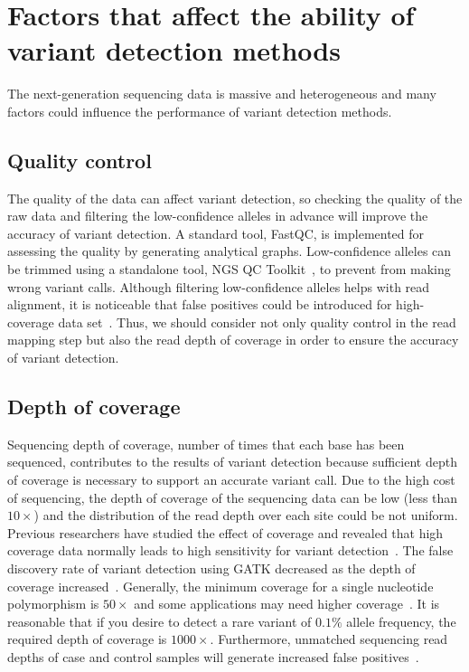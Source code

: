 \documentclass[a4,center,fleqn]{NAR}
\begin{document}
\section{Factors that affect the ability of variant detection methods}

The next-generation sequencing data is massive and heterogeneous and many factors could influence the performance of variant detection methods.
\subsection{Quality control}

The quality of the data can affect variant detection, so checking the quality of the raw data and filtering the low-confidence alleles in advance will improve the accuracy of variant detection.
A standard tool, FastQC, is implemented for assessing the quality by generating analytical graphs.
Low-confidence alleles can be trimmed using a standalone tool, NGS QC Toolkit~\citep{patel2012ngs}, to prevent from making wrong variant calls.
Although filtering low-confidence alleles helps with read alignment, it is noticeable that false positives could be introduced for high-coverage data set~\citep{liu2012steps}.
Thus, we should consider not only quality control in the read mapping step but also the read depth of coverage in order to ensure the accuracy of variant detection.

\subsection{Depth of coverage}

Sequencing depth of coverage, number of times that each base has been sequenced, contributes to the results of variant detection because sufficient depth of coverage is necessary to support an accurate variant call.
Due to the high cost of sequencing, the depth of coverage of the sequencing data can be low (less than $10\times$) and the distribution of the read depth over each site could be not uniform.
Previous researchers have studied the effect of coverage and revealed that high coverage data normally leads to high sensitivity for variant detection~\citep{neuman2013analysis, krawitz2010microindel, Cheng2014}.
The false discovery rate of variant detection using GATK decreased as the depth of coverage increased~\citep{liu2013variant}.
Generally, the minimum coverage for a single nucleotide polymorphism is $50\times$ and some applications may need higher coverage~\citep{Schlotterer2014}.
It is reasonable that if you desire to detect a rare variant of $0.1\%$ allele frequency, the required depth of coverage is $1000\times$.
Furthermore, unmatched sequencing read depths of case and control samples will generate increased false positives~\citep{garner2011confounded}.
\end{document}
